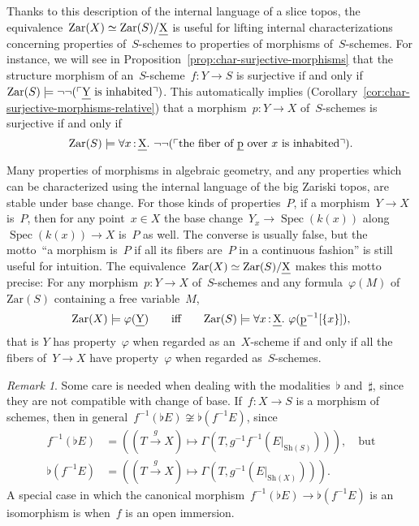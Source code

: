 \documentclass[10pt,reqno,a4paper]{amsbook}
\theoremstyle{definition}
\theoremstyle{plain}
\theoremstyle{remark}
\newtheorem{rem}[defn]{Remark}
\renewcommand{\AA}{\mathbb{A}}
\let\oldul\ul
\renewcommand{\ul}[1]{\text{\oldul{$#1$}}}
\newcommand{\Sh}{\mathrm{Sh}}
\newcommand{\Zar}{\mathrm{Zar}}
\DeclareMathOperator{\Spec}{Spec}
\newcommand{\?}{\,{:}\,}
\renewcommand{\_}{\mathpunct{.}\,}
\newcommand{\speak}[1]{\ulcorner\text{\textnormal{#1}}\urcorner}
\newcommand{\affl}{\ensuremath{{\ul{\AA}^1_S}}\xspace}
\newcommand{\xra}{\xrightarrow}
\begin{document}
Thanks to this description of the internal language of a slice topos, the
equivalence~$\Zar(X) \simeq \Zar(S)/\ul{X}$ is useful for lifting internal
characterizations concerning properties of~$S$-schemes to properties of
morphisms of~$S$-schemes. For instance, we will see in
Proposition~\ref{prop:char-surjective-morphisms} that the structure morphism of
an~$S$-scheme~$f : Y \to S$ is surjective if and only if
$\Zar(S) \models \neg\neg(\speak{$\ul{Y}$ is inhabited})$.
This automatically implies (Corollary~\ref{cor:char-surjective-morphisms-relative})
that a morphism~$p : Y \to X$ of~$S$-schemes is surjective if and only if
\[ \Zar(S) \models \forall x\?\ul{X}\_ \neg\neg(\speak{the fiber of~$\ul{p}$
over~$x$ is inhabited}). \]

Many properties of morphisms in algebraic geometry, and any properties which
can be characterized using the internal language of the big Zariski topos, are
stable under base change. For those kinds of properties~$P$, if a morphism~$Y
\to X$ is~$P$, then for any point~$x \in X$ the base change~$Y_x \to
\Spec(k(x))$ along~$\Spec(k(x)) \to X$ is~$P$ as well. The converse is usually
false, but the motto~``a morphism is~$P$ if all its fibers are~$P$ in a
continuous fashion'' is still useful for intuition. The equivalence~$\Zar(X)
\simeq \Zar(S)/\ul{X}$ makes this motto precise: For any morphism~$p : Y \to X$
of~$S$-schemes and any formula~$\varphi(M)$ of~$\Zar(S)$ containing a free
variable~$M$,
\[ \Zar(X) \models \varphi(\ul{Y}) \qquad\text{iff}\qquad
  \Zar(S) \models \forall x\?\ul{X}\_ \varphi(\ul{p}^{-1}[\{x\}]), \]
that is $Y$ has property~$\varphi$ when regarded as an~$X$-scheme if and only
if all the fibers of~$Y \to X$ have property~$\varphi$ when regarded
as~$S$-schemes.

%
%

\begin{rem}Some care is needed when dealing with the modalities~$\flat$
and~$\sharp$, since they are not compatible with change of base.
If~$f : X \to S$ is a morphism of schemes, then in general~$f^{-1}(\flat E)
\not\cong \flat(f^{-1}E)$, since
\begin{align*}
  f^{-1}(\flat E) &= ((T \xra{g} X) \mapsto \Gamma(T,
  g^{-1}f^{-1}(E|_{\Sh(S)}))), \quad\text{but}\\
  \flat(f^{-1} E) &= ((T \xra{g} X) \mapsto \Gamma(T, g^{-1}(E|_{\Sh(X)}))).
\end{align*}
A special case in which the canonical morphism~$f^{-1}(\flat E) \to
\flat(f^{-1}E)$ is an isomorphism is when~$f$ is an open immersion.
\end{rem}
\end{document}
